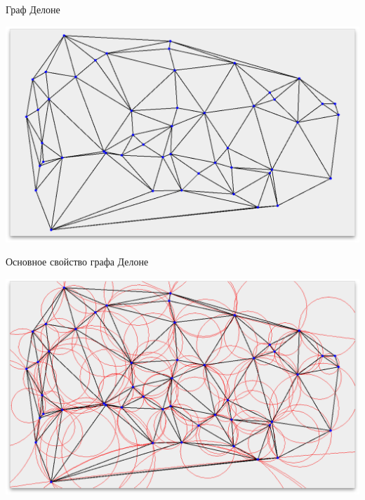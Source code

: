 \documentclass[14pt, fleqn, xcolor={dvipsnames, table}]{beamer}
\begin{document}
        \begin{frame}{Граф Делоне}
            \begin{center}
	            \includegraphics[scale=0.295]{voronoi-3.png}
	        \end{center}       
        \end{frame}
        
        \begin{frame}{Основное свойство графа Делоне}
            \begin{center}
	            \includegraphics[scale=0.295]{voronoi-4.png}
	        \end{center}       
        \end{frame}
        
\end{document}
